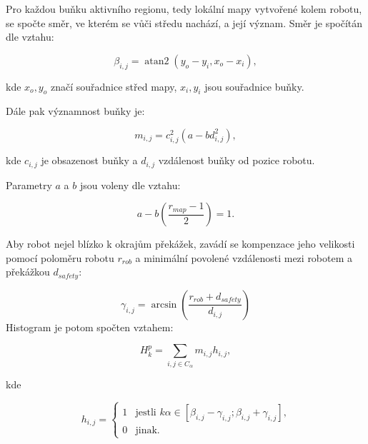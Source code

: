 \documentclass[twoside]{ctuthesis}
\theoremstyle{plain}
\theoremstyle{definition}
\theoremstyle{note}
\DeclareMathOperator{\atantwo}{atan2}
\begin{document}
Pro každou buňku aktivního regionu, tedy lokální mapy vytvořené kolem robotu, se spočte směr, ve kterém se vůči středu nachází, a její význam.
Směr je spočítán dle vztahu:

\begin{equation}
\beta_{i,j} = 	\atantwo ( y_o - y_i, x_o - x_i),
\end{equation}

kde $x_o, y_o$ značí souřadnice střed mapy, $x_i, y_i$ jsou souřadnice buňky.

Dále pak významnost buňky je:

\begin{equation}
m_{i,j} = c_{i,j}^2(a - bd_{i,j}^2),
\end{equation}

kde $c_{i,j}$ je obsazenost buňky a $d_{i,j}$ vzdálenost buňky od pozice robotu.

Parametry $a$ a $b$ jsou voleny dle vztahu:

\begin{equation}
a - b\left(\frac{r_{map} - 1}{2}\right)   = 1.
\end{equation}


Aby robot nejel blízko k okrajům překážek, zavádí se kompenzace jeho velikosti pomocí poloměru robotu $r_{rob}$ a minimální povolené vzdálenosti mezi robotem a překážkou $d_{safety}$:

$$\gamma_{i,j} = \arcsin\left(\frac{r_{rob} + d_{safety}}{d_{i,j}}\right)$$
Histogram je potom spočten vztahem:

\begin{equation}
H_k^p = \sum_{i,j \in C_{\alpha} } m_{i,j}h_{i,j},
\end{equation}

kde

$$h_{i,j} = \left\{
\begin{array}{ll}
1&\textrm{jestli $k\alpha \in \left[\beta_{i,j} - \gamma_{i,j}; \beta_{i,j} + \gamma_{i,j}\right]$,} \\
0&\textrm{jinak.}
\end{array}
\right.
$$
\end{document}
